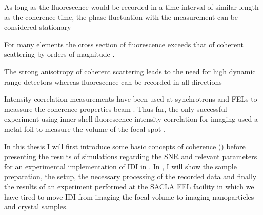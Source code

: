  

 

As long as the fluorescence would be recorded in a time interval of similar length as the coherence time, the phase fluctuation with the measurement can be considered stationary



For many elements the cross section of fluorescence exceeds that of coherent scattering by orders of magnitude \cite{xraylib}.



The strong anisotropy of coherent scattering leads to the need for high dynamic range detectors  whereas fluorescence can be recorded in all directions


Intensity correlation measurements have been used at synchrotrons and FELs to meassure the coherence properties beam \cite{yabashi2002,singer2013,inoue2019,gorobtsov2018}. Thus far, the only successful experiment using inner shell fluorescence intensity correlation for imaging used a metal foil to measure the volume of the focal spot \cite{nakumura2020}.


In this thesis I will first introduce some basic concepts of coherence () before presenting the results of simulations regarding the SNR and relevant parameters for an experimental implementation of IDI in . In , I will show the sample preparation, the setup, the necessary processing of the recorded data and finally the results of an experiment performed at the SACLA FEL facility in which we have tired to move IDI from imaging the focal volume to imaging nanoparticles and crystal samples.

\cleardoublepage

